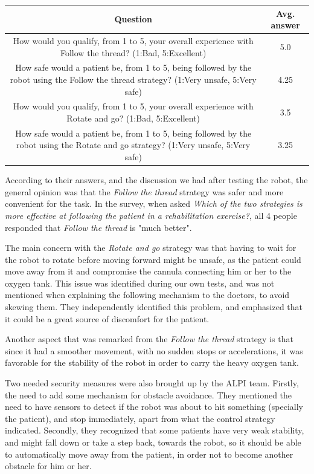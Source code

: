 \documentclass[journal]{IEEEtran}
\begin{document}
\begin{table}[t]
\begin{center}
\begin{tabular}[!t]{|c|c|}
\hline
Question & Avg. answer \\
\hline
How would you qualify, from 1 to 5, your overall experience with Follow the thread? (1:Bad, 5:Excellent)  & 5.0\\
\hline
How safe would a patient be, from 1 to 5, being followed by the robot using the Follow the thread strategy? (1:Very unsafe, 5:Very safe)  & 4.25\\
\hline
How would you qualify, from 1 to 5, your overall experience with Rotate and go? (1:Bad, 5:Excellent)  & 3.5\\
\hline
How safe would a patient be, from 1 to 5, being followed by the robot using the Rotate and go strategy? (1:Very unsafe, 5:Very safe) & 3.25\\
\hline
\end{tabular}
\label{tab:alpi_q_table_1}
\end{center}
\end{table}

According to their answers, and the discussion we had after testing the robot, the general opinion was that the \textit{Follow the thread} strategy was safer and more convenient for the task. In the survey, when asked \textit{Which of the two strategies is more effective at following the patient in a rehabilitation exercise?}, all 4 people responded that \textit{Follow the thread} is "much better".

The main concern with the \textit{Rotate and go} strategy was that having to wait for the robot to rotate before moving forward might be unsafe, as the patient could move away from it and compromise the cannula connecting him or her to the oxygen tank. This issue was identified during our own tests, and was not mentioned when explaining the following mechanism to the doctors, to avoid skewing them. They independently identified this problem, and emphasized that it could be a great source of discomfort for the patient.

Another aspect that was remarked from the \textit{Follow the thread} strategy is that since it had a smoother movement, with no sudden stops or accelerations, it was favorable for the stability of the robot in order to carry the heavy oxygen tank.

Two needed security measures were also brought up by the ALPI team. Firstly, the need to add some mechanism for obstacle avoidance. They mentioned the need to have sensors to detect if the robot was about to hit something (specially the patient), and stop immediately, apart from what the control strategy indicated. Secondly, they recognized that some patients have very weak stability, and might fall down or take a step back, towards the robot, so it should be able to automatically move away from the patient, in order not to become another obstacle for him or her. 
\end{document}
